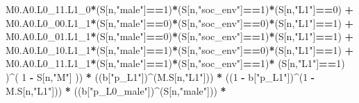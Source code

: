 \documentclass[
]{book}
\newenvironment{Shaded}{\begin{snugshade}}{\end{snugshade}}
\newcommand{\DecValTok}[1]{\textcolor[rgb]{0.00,0.00,0.81}{#1}}
\newcommand{\NormalTok}[1]{#1}
\newcommand{\SpecialCharTok}[1]{\textcolor[rgb]{0.81,0.36,0.00}{\textbf{#1}}}
\newcommand{\StringTok}[1]{\textcolor[rgb]{0.31,0.60,0.02}{#1}}
\begin{document}
\begin{Shaded}
\begin{Highlighting}[]
\NormalTok{          M0.A0.L0\_11.L1\_0}\SpecialCharTok{*}\NormalTok{(S[n,}\StringTok{"male"}\NormalTok{]}\SpecialCharTok{==}\DecValTok{1}\NormalTok{)}\SpecialCharTok{*}\NormalTok{(S[n,}\StringTok{"soc\_env"}\NormalTok{]}\SpecialCharTok{==}\DecValTok{1}\NormalTok{)}\SpecialCharTok{*}\NormalTok{(S[n,}\StringTok{"L1"}\NormalTok{]}\SpecialCharTok{==}\DecValTok{0}\NormalTok{) }\SpecialCharTok{+}
\NormalTok{          M0.A0.L0\_00.L1\_1}\SpecialCharTok{*}\NormalTok{(S[n,}\StringTok{"male"}\NormalTok{]}\SpecialCharTok{==}\DecValTok{0}\NormalTok{)}\SpecialCharTok{*}\NormalTok{(S[n,}\StringTok{"soc\_env"}\NormalTok{]}\SpecialCharTok{==}\DecValTok{0}\NormalTok{)}\SpecialCharTok{*}\NormalTok{(S[n,}\StringTok{"L1"}\NormalTok{]}\SpecialCharTok{==}\DecValTok{1}\NormalTok{) }\SpecialCharTok{+}
\NormalTok{          M0.A0.L0\_01.L1\_1}\SpecialCharTok{*}\NormalTok{(S[n,}\StringTok{"male"}\NormalTok{]}\SpecialCharTok{==}\DecValTok{0}\NormalTok{)}\SpecialCharTok{*}\NormalTok{(S[n,}\StringTok{"soc\_env"}\NormalTok{]}\SpecialCharTok{==}\DecValTok{1}\NormalTok{)}\SpecialCharTok{*}\NormalTok{(S[n,}\StringTok{"L1"}\NormalTok{]}\SpecialCharTok{==}\DecValTok{1}\NormalTok{) }\SpecialCharTok{+}
\NormalTok{          M0.A0.L0\_10.L1\_1}\SpecialCharTok{*}\NormalTok{(S[n,}\StringTok{"male"}\NormalTok{]}\SpecialCharTok{==}\DecValTok{1}\NormalTok{)}\SpecialCharTok{*}\NormalTok{(S[n,}\StringTok{"soc\_env"}\NormalTok{]}\SpecialCharTok{==}\DecValTok{0}\NormalTok{)}\SpecialCharTok{*}\NormalTok{(S[n,}\StringTok{"L1"}\NormalTok{]}\SpecialCharTok{==}\DecValTok{1}\NormalTok{) }\SpecialCharTok{+}
\NormalTok{          M0.A0.L0\_11.L1\_1}\SpecialCharTok{*}\NormalTok{(S[n,}\StringTok{"male"}\NormalTok{]}\SpecialCharTok{==}\DecValTok{1}\NormalTok{)}\SpecialCharTok{*}\NormalTok{(S[n,}\StringTok{"soc\_env"}\NormalTok{]}\SpecialCharTok{==}\DecValTok{1}\NormalTok{)}\SpecialCharTok{*}
\NormalTok{          (S[n,}\StringTok{"L1"}\NormalTok{]}\SpecialCharTok{==}\DecValTok{1}\NormalTok{) )}\SpecialCharTok{\^{}}\NormalTok{( }\DecValTok{1} \SpecialCharTok{{-}}\NormalTok{ S[n,}\StringTok{"M"}\NormalTok{] )) }\SpecialCharTok{*}
\NormalTok{      ((b[}\StringTok{"p\_L1"}\NormalTok{])}\SpecialCharTok{\^{}}\NormalTok{(M.S[n,}\StringTok{"L1"}\NormalTok{])) }\SpecialCharTok{*}
\NormalTok{      ((}\DecValTok{1} \SpecialCharTok{{-}}\NormalTok{ b[}\StringTok{"p\_L1"}\NormalTok{])}\SpecialCharTok{\^{}}\NormalTok{(}\DecValTok{1} \SpecialCharTok{{-}}\NormalTok{ M.S[n,}\StringTok{"L1"}\NormalTok{])) }\SpecialCharTok{*}
\NormalTok{      ((b[}\StringTok{"p\_L0\_male"}\NormalTok{])}\SpecialCharTok{\^{}}\NormalTok{(S[n,}\StringTok{"male"}\NormalTok{])) }\SpecialCharTok{*} 

\end{Highlighting}
\end{Shaded}
\end{document}
